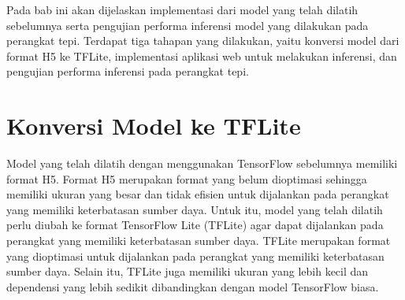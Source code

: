 %
%
% 
%
%

Pada bab ini akan dijelaskan implementasi dari model yang telah dilatih sebelumnya serta pengujian performa inferensi model yang dilakukan pada perangkat tepi.
Terdapat tiga tahapan yang dilakukan, yaitu konversi model dari format H5 ke TFLite, implementasi aplikasi web untuk melakukan inferensi, dan pengujian performa inferensi pada perangkat tepi.

\section{Konversi Model ke TFLite}

Model yang telah dilatih dengan menggunakan TensorFlow sebelumnya memiliki format H5.
Format H5 merupakan format yang belum dioptimasi sehingga memiliki ukuran yang besar dan tidak efisien untuk dijalankan pada perangkat yang memiliki keterbatasan sumber daya.
Untuk itu, model yang telah dilatih perlu
diubah ke format TensorFlow Lite (TFLite) agar dapat dijalankan pada perangkat yang memiliki keterbatasan sumber daya.
TFLite merupakan format yang dioptimasi untuk dijalankan pada perangkat yang memiliki keterbatasan sumber daya.
Selain itu, TFLite juga memiliki ukuran yang lebih kecil dan dependensi yang lebih sedikit dibandingkan dengan model TensorFlow biasa.

